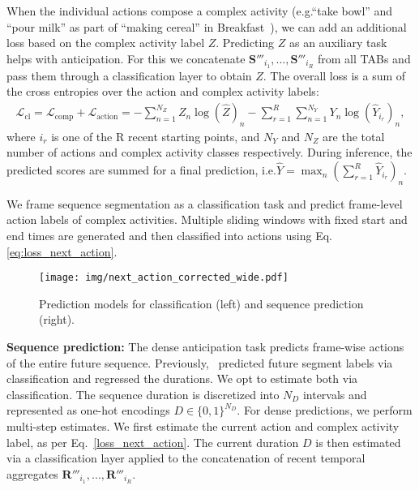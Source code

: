 \documentclass[runningheads]{llncs}
\makeatletter
\newcommand*{\eg}{e.g.\@\xspace}
\newcommand*{\ie}{i.e.\@\xspace}
\makeatother
\begin{document}
When the individual actions compose a complex activity (\eg ``take bowl'' and ``pour milk'' as part of ``making cereal''  in Breakfast~\cite{kuehne2014language}), we can add an additional loss based on the complex activity label $Z$. Predicting $Z$ as an auxiliary task helps with anticipation. For this we concatenate $\textbf{S}'''_{i_1}, \ldots, \textbf{S}'''_{i_R}$ from all TABs and pass them through a classification layer to obtain $\hat{Z}$. The overall loss is a sum of the cross entropies over the action and complex activity labels: 
\begin{align}\label{eq:loss_next_action}
 \mathcal{L}_{\text{cl}} = \mathcal{L}_{\text{comp}} + \mathcal{L}_{\text{action}}
 = - \sum_{n=1}^{N_Z} Z_n \log ( \hat{Z} )_n - \sum_{r=1}^{R} \sum_{n=1}^{N_Y} Y_n \log ( \hat{Y}_{i_r} )_n,
\end{align}
where $i_r$ is one of the R recent starting points, and $N_Y$ and $N_Z$ are the total number of actions and complex activity classes respectively. During inference, the predicted scores   are summed for a final prediction, \ie $\hat{Y}\!=\! \max_n(\sum_{r = 1}^R \hat{Y}_{i_r})_n\label{inference_next}$. 

We frame sequence segmentation as a classification task and predict frame-level action labels of complex activities. Multiple sliding windows with fixed start and end times are generated and then classified into actions using Eq.\ref{eq:loss_next_action}. 
 
\begin{figure}[t]
\centering 
\texttt{[image: img/next\_action\_corrected\_wide.pdf]}
\caption{Prediction models for classification (left) and sequence prediction (right).} 
\label{fig:next_action_pred} 
\end{figure} 

\textbf{Sequence prediction:} The dense anticipation task predicts frame-wise actions of the entire future sequence. Previously,~\cite{abu2018will} predicted future segment labels via classification and regressed the durations. We opt to estimate both via classification. The sequence duration is discretized into $N_D$ intervals and represented as one-hot encodings $D\in \{0,1\}^{N_D}$.  For dense predictions, we perform multi-step estimates.  We first estimate the current action and complex activity label, as per Eq.~\ref{loss_next_action}. The current duration $D$ is then estimated via a classification layer applied to the concatenation of recent temporal aggregates $\textbf{R}'''_{i_1}, ..., \textbf{R}'''_{i_R}$. 
\end{document}
